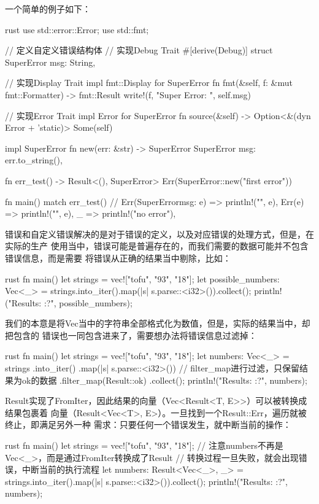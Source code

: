 一个简单的例子如下：
\begin{code-block}{rust}
use std::error::Error;
use std::fmt;

// 定义自定义错误结构体
// 实现Debug Trait
#[derive(Debug)]
struct SuperError {
    msg: String,
}

// 实现Display Trait
impl fmt::Display for SuperError {
    fn fmt(&self, f: &mut fmt::Formatter) -> fmt::Result {
        write!(f, "Super Error: {}", self.msg)
    }
}

// 实现Error Trait
impl Error for SuperError {
    fn source(&self) -> Option<&(dyn Error + 'static)> {
        Some(self)
    }
}

impl SuperError {
    fn new(err: &str) -> SuperError {
        SuperError {
            msg: err.to_string(),
        }
    }
}

fn err_test() -> Result<(), SuperError> {
    Err(SuperError::new("first error"))
}

fn main() {
    match err_test() {
        // Err(SuperError{msg: e}) => println!("{}", e),
        Err(e) => println!("{}", e),
        _ => println!("no error"),
    }
}
\end{code-block}

错误和自定义错误解决的是对于错误的定义，以及对应错误的处理方式，但是，在实际的生产
使用当中，错误可能是普遍存在的，而我们需要的数据可能并不包含错误信息，而是需要
将错误从正确的结果当中剔除，比如：
\begin{code-block}{rust}
fn main() {
    let strings = vec!["tofu", "93", "18"];
    let possible_numbers: Vec<_> = strings.into_iter().map(|s| s.parse::<i32>()).collect();
    println!("Results: {:?}", possible_numbers);
}
\end{code-block}
我们的本意是将Vec当中的字符串全部格式化为数值，但是，实际的结果当中，却把包含的
错误也一同包含进来了，需要想办法将错误信息过滤掉：
\begin{code-block}{rust}
fn main() {
    let strings = vec!["tofu", "93", "18"];
    let numbers: Vec<_> = strings
        .into_iter()
        .map(|s| s.parse::<i32>())
        // filter_map进行过滤，只保留结果为ok的数据
        .filter_map(Result::ok)
        .collect();
    println!("Results: {:?}", numbers);
}
\end{code-block}

Result实现了FromIter，因此结果的向量（Vec<Result<T, E>>）可以被转换成结果包裹着
向量（Result<Vec<T>, E>）。一旦找到一个Result::Err，遍历就被终止，即满足另外一种
需求：只要任何一个错误发生，就中断当前的操作：
\begin{code-block}{rust}
fn main() {
    let strings = vec!["tofu", "93", "18"];
    // 注意numbers不再是Vec<_>，而是通过FromIter转换成了Result
    // 转换过程一旦失败，就会出现错误，中断当前的执行流程
    let numbers: Result<Vec<_>, _> = strings.into_iter().map(|s| s.parse::<i32>()).collect();
    println!("Results: {:?}", numbers);
}
\end{code-block}

